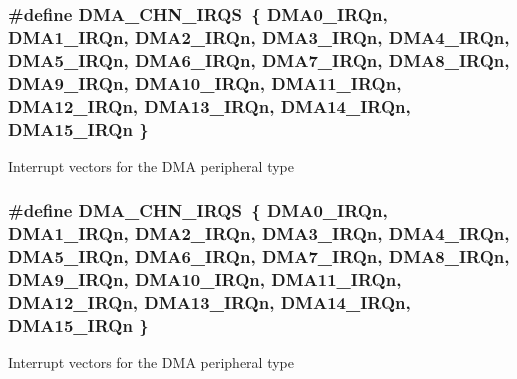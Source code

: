 \subsubsection[{\texorpdfstring{D\+M\+A\+\_\+\+C\+H\+N\+\_\+\+I\+R\+QS}{DMA_CHN_IRQS}}]{\setlength{\rightskip}{0pt plus 5cm}\#define D\+M\+A\+\_\+\+C\+H\+N\+\_\+\+I\+R\+QS~\{ {\bf D\+M\+A0\+\_\+\+I\+R\+Qn}, {\bf D\+M\+A1\+\_\+\+I\+R\+Qn}, {\bf D\+M\+A2\+\_\+\+I\+R\+Qn}, {\bf D\+M\+A3\+\_\+\+I\+R\+Qn}, {\bf D\+M\+A4\+\_\+\+I\+R\+Qn}, {\bf D\+M\+A5\+\_\+\+I\+R\+Qn}, {\bf D\+M\+A6\+\_\+\+I\+R\+Qn}, {\bf D\+M\+A7\+\_\+\+I\+R\+Qn}, {\bf D\+M\+A8\+\_\+\+I\+R\+Qn}, {\bf D\+M\+A9\+\_\+\+I\+R\+Qn}, {\bf D\+M\+A10\+\_\+\+I\+R\+Qn}, {\bf D\+M\+A11\+\_\+\+I\+R\+Qn}, {\bf D\+M\+A12\+\_\+\+I\+R\+Qn}, {\bf D\+M\+A13\+\_\+\+I\+R\+Qn}, {\bf D\+M\+A14\+\_\+\+I\+R\+Qn}, {\bf D\+M\+A15\+\_\+\+I\+R\+Qn} \}}\hypertarget{group__DMA__Peripheral__Access__Layer_ga6defb6ef05bbbec3e07f8d2610756b7b}{}\label{group__DMA__Peripheral__Access__Layer_ga6defb6ef05bbbec3e07f8d2610756b7b}
Interrupt vectors for the D\+MA peripheral type 
\subsubsection[{\texorpdfstring{D\+M\+A\+\_\+\+C\+H\+N\+\_\+\+I\+R\+QS}{DMA_CHN_IRQS}}]{\setlength{\rightskip}{0pt plus 5cm}\#define D\+M\+A\+\_\+\+C\+H\+N\+\_\+\+I\+R\+QS~\{ {\bf D\+M\+A0\+\_\+\+I\+R\+Qn}, {\bf D\+M\+A1\+\_\+\+I\+R\+Qn}, {\bf D\+M\+A2\+\_\+\+I\+R\+Qn}, {\bf D\+M\+A3\+\_\+\+I\+R\+Qn}, {\bf D\+M\+A4\+\_\+\+I\+R\+Qn}, {\bf D\+M\+A5\+\_\+\+I\+R\+Qn}, {\bf D\+M\+A6\+\_\+\+I\+R\+Qn}, {\bf D\+M\+A7\+\_\+\+I\+R\+Qn}, {\bf D\+M\+A8\+\_\+\+I\+R\+Qn}, {\bf D\+M\+A9\+\_\+\+I\+R\+Qn}, {\bf D\+M\+A10\+\_\+\+I\+R\+Qn}, {\bf D\+M\+A11\+\_\+\+I\+R\+Qn}, {\bf D\+M\+A12\+\_\+\+I\+R\+Qn}, {\bf D\+M\+A13\+\_\+\+I\+R\+Qn}, {\bf D\+M\+A14\+\_\+\+I\+R\+Qn}, {\bf D\+M\+A15\+\_\+\+I\+R\+Qn} \}}\hypertarget{group__DMA__Peripheral__Access__Layer_ga6defb6ef05bbbec3e07f8d2610756b7b}{}\label{group__DMA__Peripheral__Access__Layer_ga6defb6ef05bbbec3e07f8d2610756b7b}
Interrupt vectors for the D\+MA peripheral type 